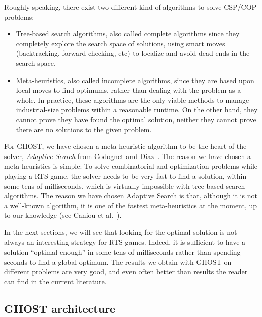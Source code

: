 \documentclass[journal]{IEEEtran}
\newcommand{\csp}{\textsc{CSP}\xspace}
\newcommand{\cop}{\textsc{COP}\xspace}
\newcommand{\ghost}{\textsc{GHOST}\xspace}
\begin{document}
Roughly  speaking, there  exist two  different kind  of algorithms  to
solve \csp/\cop problems: 
\begin{itemize}
\item Tree-based  search algorithms,  also called  complete algorithms
  since they completely  explore the search space  of solutions, using
  smart moves  (backtracking, forward  checking, etc) to  localize and
  avoid dead-ends in the search space.
\item Meta-heuristics,  also called incomplete algorithms,  since they
  are based  upon local  moves to find  optimums, rather  than dealing
  with the problem  as a whole. In practice, these  algorithms are the
  only  viable methods  to  manage industrial-size  problems within  a
  reasonable runtime. On  the other hand, they cannot  prove they have
  found the optimal  solution, neither they cannot prove  there are no
  solutions to the given problem.
\end{itemize}

For \ghost, we have chosen a  meta-heuristic algorithm to be the heart
of   the   solver,   {\it   Adaptive   Search}   from   Codognet   and
Diaz~\cite{Codognet01}. The reason we have chosen a meta-heuristics is
simple: To solve combinatorial and optimization problems while playing
a RTS  game, the  solver needs  to be  very fast  to find  a solution,
within some tens  of milliseconds, which is  virtually impossible with
tree-based  search  algorithms. The  reason  we  have chosen  Adaptive
Search is that,  although it is not a well-known  algorithm, it is one
of the fastest meta-heuristics at the moment, up to our knowledge (see
Caniou et al.~\cite{Caniou14}).

In  the next  sections,  we  will see  that  looking  for the  optimal
solution is not always an  interesting strategy for RTS games. Indeed,
it is sufficient to have a solution ``optimal enough'' in some tens of
milliseconds   rather  than   spending  seconds   to  find   a  global
optimum. The results  we obtain with \ghost on  different problems are
very good, and  even often better than results the  reader can find in
the current literature.

\subsection{\ghost architecture}
\end{document}

